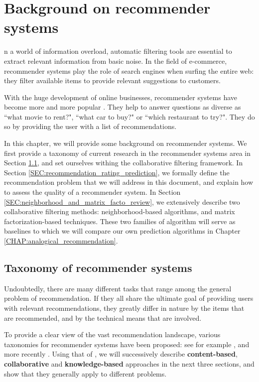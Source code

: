 \chapter{Background on recommender systems}

n a world of information overload, automatic filtering tools are
essential to extract relevant information from basic noise. In the field of
e-commerce, recommender systems play the role of search engines when surfing
the entire web: they filter available items to provide relevant suggestions to
customers.

With the huge development of online businesses, recommender systems have become
more and more popular \cite{RecoSystemHandbook,AdoTuzIEEE2005}. They help to
answer questions as diverse as ``what movie to rent?", ``what car to buy?" or
``which restaurant to try?".  They do so by providing the user with a list of
recommendations.

In this chapter, we will provide some background on recommender systems. We
first provide a taxonomy of current research in the recommender systems area in
Section \ref{SEC:taxonomy_rec_sys}, and set ourselves withing the collaborative filtering
framework. In Section \ref{SEC:recommendation_rating_prediction}, we formally
define the recommendation problem that we will address in this document, and
explain how to assess the quality of a recommender system. In Section
\ref{SEC:neighborhood_and_matrix_facto_review}, we extensively describe two
collaborative filtering methods: neighborhood-based algorithms, and matrix
factorization-based techniques. These two families of algorithm will serve as
baselines to which we will compare our own prediction algorithms in Chapter
\ref{CHAP:analogical_recommendation}.

\section{Taxonomy of recommender systems}
\label{SEC:taxonomy_rec_sys}

Undoubtedly, there are many different tasks that range among the general problem
of recommendation. If they all share the ultimate goal of providing users with
relevant recommendations, they greatly differ in nature by the items that are
recommended, and by the technical means that are involved.

To provide a clear view of the vast recommendation landscape, various taxonomies
for recommender systems have been proposed: see for example \cite{Bur02,
AdoTuzIEEE2005, Bur07}, and more recently \cite{BurRam11}. Using that of
\cite{BurRam11}, we will successively describe \textbf{content-based},
\textbf{collaborative} and \textbf{knowledge-based} approaches in the next
three sections, and show that they generally apply to different problems.

